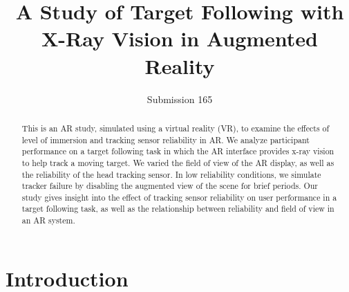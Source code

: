 \documentclass{acmsiggraph}                     %
\title{A Study of Target Following with X-Ray Vision in 
Augmented Reality}
\author{
Submission 165
}
\begin{document}


\maketitle


\begin{abstract}

This is an AR study, simulated using a virtual reality (VR), to examine the effects of level of immersion and tracking sensor reliability in AR.  We analyze participant performance on a target following task in which the AR interface provides x-ray vision to help track a moving target.  We varied the field of view of the AR display, as well as the reliability of the head tracking sensor.  In low reliability conditions, we simulate tracker failure by disabling the augmented view of the scene for brief periods.  Our study gives insight into the effect of tracking sensor reliability on user performance in a target following task, as well as the relationship between reliability and field of view in an AR system.

\end{abstract}


\begin{CRcatlist}
\end{CRcatlist}

\keywordlist

\section{Introduction}

\end{document}
